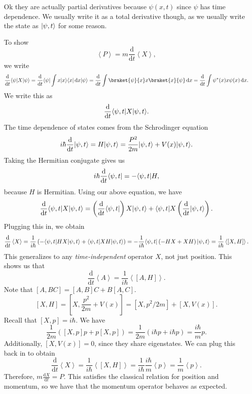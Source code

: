 Ok they are actually partial derivatives because $\psi (x,t)$ since $\psi $ has time dependence. We usually write it as a total derivative though, as we usually write the state as $\lvert\psi ,t\rangle $ for some reason.

To show
\[
	\left\langle P \right\rangle =m \frac{\mathrm{d}}{\mathrm{d}t} \left\langle X \right\rangle 
,\]
we write
\[
	\frac{\mathrm{d}}{\mathrm{d}t} \bra{\psi } X \ket{\psi } =\frac{\mathrm{d}}{\mathrm{d}t} \bra{\psi } \int x \ket{x} \bra{x}  \,\mathrm{d} x \ket{\psi } =\frac{\mathrm{d}}{\mathrm{d}t} \int \braket{\psi }{x}x \braket{x}{\psi }  \,\mathrm{d} x=\frac{\mathrm{d}}{\mathrm{d}t} \int \psi ^*(x) x \psi (x) \,\mathrm{d} x
.\]
We write this as
\[
	\frac{\mathrm{d}}{\mathrm{d}t} \langle\psi ,t\rvert X \lvert\psi ,t\rangle 
.\]
The time dependence of states comes from the Schrodinger equation
\[
	i \hbar \frac{\mathrm{d}}{\mathrm{d}t} \lvert\psi ,t\rangle =H \lvert\psi ,t\rangle =\frac{P^2}{2m} \lvert\psi ,t\rangle +V(x)\lvert\psi ,t\rangle 
.\]
Taking the Hermitian conjugate gives us
\[
	i \hbar \frac{\mathrm{d}}{\mathrm{d}t} \langle\psi ,t\rvert =-\langle\psi ,t\rvert H
,\]
because $H$ is Hermitian. Using our above equation, we have
\[
	\frac{\mathrm{d}}{\mathrm{d}t} \langle\psi ,t\rvert X\lvert\psi ,t\rangle =\left( \frac{\mathrm{d}}{\mathrm{d}t} \langle\psi ,t\rvert  \right) X\lvert\psi ,t\rangle +\langle\psi ,t\rvert X\left( \frac{\mathrm{d}}{\mathrm{d}t} \lvert\psi ,t\rangle  \right) 
.\]
Plugging this in, we obtain
\[
\frac{\mathrm{d}}{\mathrm{d}t} \left\langle X \right\rangle =\frac{1}{i\hbar } \left( -\langle\psi ,t\rvert HX\lvert\psi ,t\rangle +\langle\psi ,t\rvert XH\lvert\psi ,t\rangle  \right) =-\frac{1}{i\hbar } \langle\psi ,t\rvert \left( -HX+XH \right) \lvert\psi ,t\rangle =\frac{1}{i\hbar } \left\langle \left[ X,H \right]  \right\rangle 
.\]
This generalizes to any \emph{time-independent} operator $X$, not just position. This shows us that
\[
	\frac{\mathrm{d}}{\mathrm{d}t} \left\langle A \right\rangle =\frac{1}{i\hbar } \left\langle \left[ A,H \right] \right\rangle 
.\]
Note that $\left[ A,BC \right] =\left[ A,B \right] C+B\left[ A,C \right] $.
\[
	\left[ X,H \right] =\left[ X,\frac{p^2}{2m} +V(x) \right] =\left[ X,p^2/2m \right] +\left[ X,V\left( x \right)  \right] 
.\]
Recall that $\left[ X,p\right]=i\hbar  $. We have
\[
	\frac{1}{2m} \left(\left[ X,p \right] p+p\left[ X,p \right] \right)=\frac{1}{2m} \left(i\hbar p+i\hbar p\right)=\frac{i\hbar }{m} p
.\]
Additionally, $\left[ X,V(x) \right] =0$, since they share eigenstates. We can plug this back in to obtain
\[
	\frac{\mathrm{d}}{\mathrm{d}t} \left\langle X \right\rangle =\frac{1}{i\hbar } \left\langle \left[ X,H \right]  \right\rangle =\frac{1}{i\hbar } \frac{i\hbar }{m} \left\langle p \right\rangle =\frac{1}{m} \left\langle p \right\rangle 
.\]
Therefore, $m\frac{\mathrm{d}X}{\mathrm{d}t} =P$. This satisfies the classical relation for position and momentum, so we have that the momentum operator behaves as expected.

